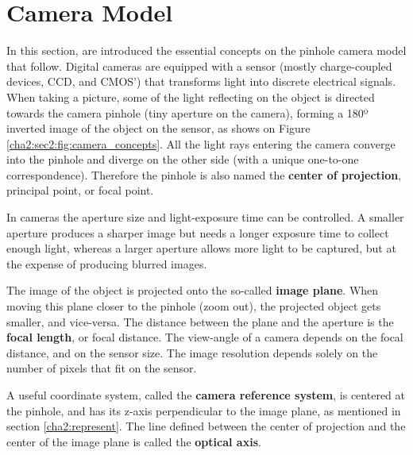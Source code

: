 
\section{Camera Model}
\label{cha2:cameramodel}

In this section, are introduced the essential concepts on the pinhole camera model that follow. Digital cameras are equipped with a sensor (mostly charge-coupled devices, CCD, and CMOS') that transforms light into discrete electrical signals. When taking a picture, some of the light reflecting on the object is directed towards the camera pinhole (tiny aperture on the camera), forming a 180º inverted image of the object on the sensor, as shows on Figure \ref{cha2:sec2:fig:camera_concepts}. All the light rays entering the camera converge into the pinhole and diverge on the other side (with a unique one-to-one correspondence). Therefore the pinhole is also named the \textbf{center of projection}, principal point, or focal point.

In cameras the aperture size and light-exposure time can be controlled. A smaller aperture produces a sharper image but needs a longer exposure time to collect enough light, whereas a larger aperture allows more light to be captured, but at the expense of producing blurred images.

The image of the object is projected onto the so-called \textbf{image plane}. When moving this plane closer to the pinhole (zoom out), the projected object gets smaller, and vice-versa. The distance between the plane and the aperture is the \textbf{focal length}, or focal distance. The view-angle of a camera depends on the focal distance, and on the sensor size. The image resolution depends solely on the number of pixels that fit on the sensor.

A useful coordinate system, called the \textbf{camera reference system}, is centered at the pinhole, and has its z-axis perpendicular to the image plane, as mentioned in section \ref{cha2:represent}. The line defined between the center of projection and the center of the image plane is called the \textbf{optical axis}.

